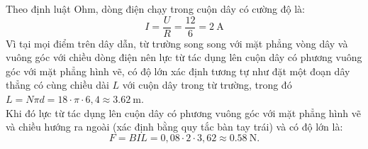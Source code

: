 \begin{ex}
{\begin{center}
		\end{center}
		Theo định luật Ohm, dòng điện chạy trong cuộn dây có cường độ là:
		$$
		I=\frac{U}{R}=\frac{12}{6}=\SI{2}{\ampere}
		$$
		Vì tại mọi điểm trên dây dẫn, từ trường song song với mặt phẳng vòng dây và vuông góc với chiều dòng điện nên lực từ tác dụng lên cuộn dây có phương vuông góc với mặt phẳng hình vẽ, có độ lớn xác định tương tự như đặt một đoạn dây thẳng có cùng chiều dài $L$ với cuộn dây trong từ trường, trong đó $L=N \pi d=18 \cdot \pi \cdot 6,4 \approx \SI{3.62}{\meter}$.\\
		Khi đó lực từ tác dụng lên cuộn dây có phương vuông góc với mặt phẳng hình vẽ và chiều hướng ra ngoài (xác định bằng quy tắc bàn tay trái) và có độ lớn là:
		$$
		F=B I L=0,08 \cdot 2 \cdot 3,62 \approx \SI{0.58}{\newton}.
		$$
	}
\end{ex}

